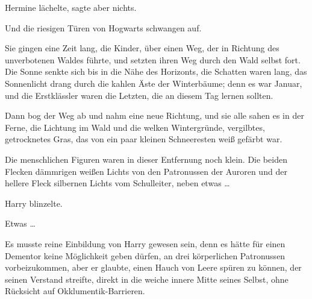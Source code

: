Hermine lächelte, sagte aber nichts.

Und die riesigen Türen von Hogwarts schwangen auf.

Sie gingen eine Zeit lang, die Kinder, über einen Weg, der in Richtung des unverbotenen Waldes führte, und setzten ihren Weg durch den Wald selbst fort. Die Sonne senkte sich bis in die Nähe des Horizonts, die Schatten waren lang, das Sonnenlicht drang durch die kahlen Äste der Winterbäume; denn es war Januar, und die Erstklässler waren die Letzten, die an diesem Tag lernen sollten.

Dann bog der Weg ab und nahm eine neue Richtung, und sie alle sahen es in der Ferne, die Lichtung im Wald und die welken Wintergründe, vergilbtes, getrocknetes Gras, das von ein paar kleinen Schneeresten weiß gefärbt war.

Die menschlichen Figuren waren in dieser Entfernung noch klein. Die beiden Flecken dämmrigen weißen Lichts von den Patronussen der Auroren und der hellere Fleck silbernen Lichts vom Schulleiter, neben etwas …

Harry blinzelte.

Etwas …

Es musste reine Einbildung von Harry gewesen sein, denn es hätte für einen Dementor keine Möglichkeit geben dürfen, an drei körperlichen Patronussen vorbeizukommen, aber er glaubte, einen Hauch von Leere spüren zu können, der seinen Verstand streifte, direkt in die weiche innere Mitte seines Selbst, ohne Rücksicht auf Okklumentik-Barrieren.

